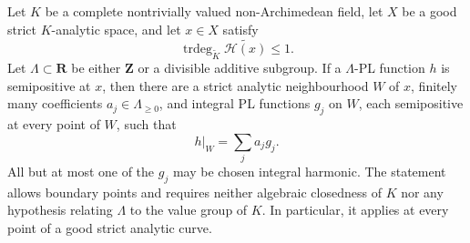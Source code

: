 \begin{theorem}\label{thm:ch18-semipositive-integral-residual-curve}
Let $K$ be a complete nontrivially valued non-Archimedean field, let $X$ be
a good strict $K$-analytic space, and let $x\in X$ satisfy
\[
 \operatorname{trdeg}_{\widetilde K}\widetilde{\mathscr H(x)}\leq1.
\]
Let
$\Lambda\subset\mathbf R$ be either $\mathbf Z$ or a divisible additive
subgroup.  If a $\Lambda$-PL function $h$ is semipositive at $x$, then there
are a strict analytic neighbourhood $W$ of $x$, finitely many coefficients
$a_j\in\Lambda_{\geq0}$, and integral PL functions $g_j$ on $W$, each
semipositive at every point of $W$, such that
\[
                         h|_W=\sum_j a_jg_j.
\]
All but at most one of the $g_j$ may be chosen integral harmonic.  The
statement allows boundary points and requires neither algebraic closedness
of $K$ nor any hypothesis relating $\Lambda$ to the value group of $K$.
In particular, it applies at every point of a good strict analytic curve.
\end{theorem}
